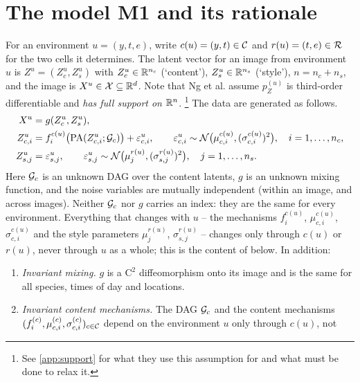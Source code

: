 \section{The model M1 and its rationale}
\label{sec:model}

\begin{definition}[Model M1]\label{def:m1}
For an environment $u=(y,t,e)$, write $c(u)=(y,t)\in\mathcal{C}$ and $r(u)=(t,e)\in\mathcal{R}$ for the two cells it
determines. The latent vector for an image from environment $u$ is $Z^u=(Z_c^u,Z_s^u)$ with
$Z_c^u\in\mathbb{R}^{n_c}$ (`content'), $Z_s^u\in\mathbb{R}^{n_s}$ (`style'), $n=n_c+n_s$, and the image is
$X^u\in\mathcal{X}\subseteq\mathbb{R}^{d}$. Note that Ng et al. assume $p^{(u)}_Z$ is third-order 
differentiable and \emph{has full support on $\mathbb{R}^n$}. 
\footnote{See \cref{app:support} for what they use this assumption for and what must be done
to relax it.}
The data are generated as follows.
\begin{align}
X^u &= g(Z_c^u,Z_s^u), \label{eq:mixing}\\
Z_{c,i}^u &= f_i^{c(u)}\bigl(\mathrm{PA}(Z_{c,i}^u;\mathcal{G}_c)\bigr) + \varepsilon_{c,i}^u,
\qquad \varepsilon_{c,i}^u\sim\mathcal{N}\bigl(\mu_{c,i}^{c(u)},(\sigma_{c,i}^{c(u)})^2\bigr),
\quad i=1,\dots,n_c, \label{eq:content}\\
Z_{s,j}^u &= \varepsilon_{s,j}^u,
\qquad \varepsilon_{s,j}^u\sim\mathcal{N}\bigl(\mu_{j}^{r(u)},(\sigma_{s,j}^{r(u)})^2\bigr),
\quad j=1,\dots,n_s. \label{eq:style}
\end{align}
Here $\mathcal{G}_c$ is an unknown DAG over the content latents, $g$ is an unknown mixing function, and the noise
variables are mutually independent (within an image, and across images). Neither $\mathcal{G}_c$ nor $g$ carries
an index: they are the same for every environment. Everything that changes with $u$ -- the mechanisms
$f_i^{c(u)}$, $\mu_{c,i}^{c(u)}$, $\sigma_{c,i}^{c(u)}$ and the style parameters $\mu_j^{r(u)}$, $\sigma_{s,j}^{r(u)}$ --
changes only through $c(u)$ or $r(u)$, never through $u$ as a whole; this is the content of
 below. In addition:
\begin{enumerate}[label=(P\arabic*),leftmargin=2.4em]
\item \label{item:P1} \emph{Invariant mixing.} $g$ is a $\mathrm{C}^2$ diffeomorphism onto its image and is the same for all
      species, times of day and locations.
\item \label{item:P2} \emph{Invariant content mechanisms.} The DAG $\mathcal{G}_c$ and the content mechanisms
      $(f_i^{(c)},\mu_{c,i}^{(c)},\sigma_{c,i}^{(c)})_{c\in\mathcal{C}}$ depend on the environment $u$ only through $c(u)$, not

\end{enumerate}
\end{definition}
